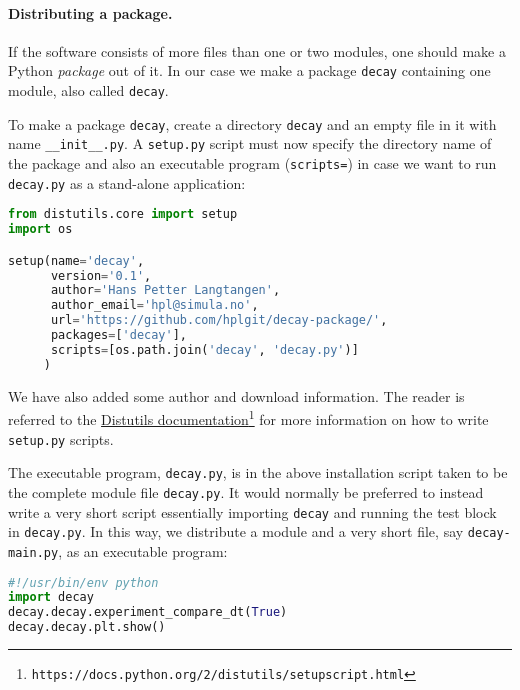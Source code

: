 \documentclass[graybox,sectrefs,envcountresetchap,open=right,final]{svmonodo}
\newenvironment{notice_mdfboxadmon}[1][]{
\begin{notice_mdfboxmdframed}[frametitle=#1]
}
{
\end{notice_mdfboxmdframed}
}
\begin{document}
\paragraph{Distributing a package.}
If the software consists of more files than one or two modules, one
should make a Python \emph{package} out of it. In our case we make a
package \texttt{decay} containing one module, also called \texttt{decay}.

To make a package \texttt{decay}, create a directory \texttt{decay} and an empty
file in it with name \Verb!__init__.py!.
A \texttt{setup.py} script must now specify the directory name of the package
and also an executable program (\texttt{scripts=})
in case we want to run \texttt{decay.py} as a stand-alone application:

\begin{lstlisting}[language=Python,style=blue1bar_bluegreen]
from distutils.core import setup
import os

setup(name='decay',
      version='0.1',
      author='Hans Petter Langtangen',
      author_email='hpl@simula.no',
      url='https://github.com/hplgit/decay-package/',
      packages=['decay'],
      scripts=[os.path.join('decay', 'decay.py')]
     )
\end{lstlisting}
We have also added some author and download information.
The reader is referred to the \href{{https://docs.python.org/2/distutils/setupscript.html}}{Distutils documentation}\footnote{\texttt{https://docs.python.org/2/distutils/setupscript.html}} for more information on how to
write \texttt{setup.py} scripts.



\begin{notice_mdfboxadmon}
The executable program, \texttt{decay.py}, is in the above installation
script taken to be the complete
module file \texttt{decay.py}. It would normally be preferred to instead
write a very short script essentially importing \texttt{decay} and running
the test block in \texttt{decay.py}.  In this way, we distribute a module and
a very short file, say \texttt{decay-main.py}, as an executable program:

\begin{lstlisting}[language=Python,style=blue1bar_bluegreen]
#!/usr/bin/env python
import decay
decay.decay.experiment_compare_dt(True)
decay.decay.plt.show()
\end{lstlisting}
\end{notice_mdfboxadmon}
\end{document}
